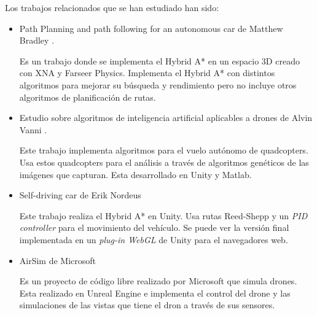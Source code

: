 

Los trabajos relacionados que se han estudiado han sido: 
\begin{itemize}
\item Path Planning and path following for an autonomous car de Matthew Bradley \cite{bradley2012path}.

Es un trabajo donde se implementa el Hybrid A* en un espacio 3D creado con XNA y Farseer Physics. Implementa el Hybrid A* con distintos algoritmos para mejorar su búsqueda y rendimiento pero no incluye otros algoritmos de planificación de rutas.

\item Estudio sobre algoritmos de inteligencia artificial aplicables a drones de Alvin Vanni \cite{vanni2016drones}.

Este trabajo implementa algoritmos para el vuelo autónomo de quadcopters. Usa estos quadcopters para el análisis a través de algoritmos genéticos de las imágenes que capturan. Esta desarrollado en Unity y Matlab.

\item Self-driving car de Erik Nordeus \cite{nordeus}

Este trabajo realiza el Hybrid A* en Unity. Usa rutas Reed-Shepp y un \textit{PID controller} para el movimiento del vehículo. Se puede ver la versión final implementada en un \textit{plug-in WebGL} de Unity para el navegadores web.

\item AirSim de Microsoft \cite{msairsim}

Es un proyecto de código libre realizado por Microsoft que simula drones. Esta realizado en Unreal Engine e implementa el control del drone y las simulaciones de las vistas que tiene el dron a través de sus sensores.
\end{itemize}
